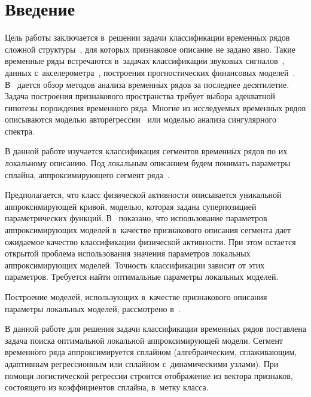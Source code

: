 \thispagestyle{headings}

\begin{multicols}{2}

\label{st\stat}


\section{Введение}

Цель работы заключается в~решении задачи классификации временн$\acute{\mbox{ы}}$х рядов 
сложной структуры~\cite{Karasikov2016,Farmer1987}, для которых признаковое 
описание не задано  явно. Такие временные ряды встречаются в~задачах 
классификации звуковых сигналов~\cite{myas1970}, данных 
с~акселерометра~\cite{Gary2011,ivkin2015}, построения прогностических 
финансовых моделей~\cite{Tsay2010}. В~\cite{Esl2012,Fu2011} дается обзор 
методов анализа временн$\acute{\mbox{ы}}$х рядов за последнее десятилетие.  
Задача построения признакового пространства требует выбора адекватной 
гипотезы порождения временн$\acute{\mbox{о}}$го ряда. Многие 
из ис\-сле\-ду\-емых временн$\acute{\mbox{ы}}$х рядов 
описываются моделью авторегрессии~\cite{SEMOR2004,Fatma} или 
моделью анализа сингулярного спектра.

В данной работе изучается классификация сегментов временн$\acute{\mbox{ы}}$х рядов по 
их локальному описанию. Под локальным описанием будем понимать параметры 
сплайна, аппроксимирующего сегмент ряда~\cite{Istomin2005,Tselykh2012,Det2007}.

Предполагается, что класс физической ак\-тив\-ности описывается уникальной 
аппрокси\-ми\-ру\-ющей кривой, моделью, которая задана су\-перпозицией параметрических функций.  
В~\cite{Karasikov2016,ivkin2015} показано, что использование параметров 
ап\-про\-кси\-ми\-ру\-ющих моделей в~качестве признакового описания сегмента дает 
ожидаемое качество классификации физической активности.
%
При этом остается открытой проблема использования значения параметров локальных 
аппроксимирующих моделей. Точность классификации зависит от этих па\-ра\-мет\-ров. 
Требуется найти оптимальные па\-ра\-мет\-ры локальных моделей. 

Построение моделей, 
использующих в~качестве признакового описания параметры локальных моделей, 
рассмотрено в~\cite{Gholizadeh2009}.

В данной работе для решения задачи классификации временн$\acute{\mbox{ы}}$х рядов поставлена 
задача поиска оптимальной локальной аппроксимирующей модели. Сегмент 
временн$\acute{\mbox{о}}$го 
ряда аппроксимируется сплайном (алгебраическим, сглаживающим, адаптивным 
регрессионным или сплайном с~динамическими узлами). При помощи логистической 
регрессии строится отображение из вектора признаков, состоящего из коэффициентов 
сплайна, в~метку класса.


\end{multicols}
